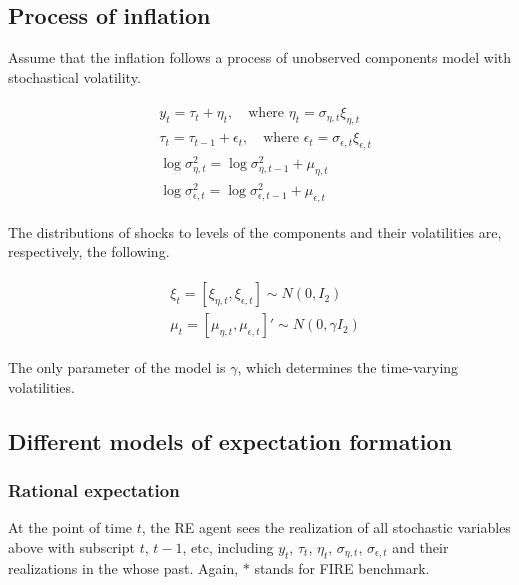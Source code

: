 \documentclass[]{article}
\begin{document}
\subsection{Process of inflation}

Assume that the inflation follows a process of unobserved components model with stochastical volatility. 

\begin{eqnarray}
\begin{split}
& y_t = \tau_t + \eta_t,\quad \textrm{where } \eta_t =\sigma_{\eta,t} \xi_{\eta,t} \\
& \tau_t = \tau_{t-1} + \epsilon_t, \quad \textrm{where }  \epsilon_t =\sigma_{\epsilon,t} \xi_{\epsilon,t} \\
& \log\sigma^2_{\eta,t} = \log\sigma^2_{\eta,t-1} + \mu_{\eta,t} \\
& \log\sigma^2_{\epsilon,t} = \log\sigma^2_{\epsilon,t-1} + \mu_{\epsilon,t} 
\end{split}
\end{eqnarray}

The distributions of shocks to levels of the components and their volatilities are, respectively, the following.

\begin{eqnarray}
\begin{split}
& \xi_t =[\xi_{\eta,t},\xi_{\epsilon,t}] \sim N(0,I_2) \\
& \mu_{t} = [\mu_{\eta,t},\mu_{\epsilon,t}]' \sim N(0,\gamma I_2) 
\end{split}
\end{eqnarray}

The only parameter of the model is $\gamma$, which determines the time-varying volatilities. 

\subsection{Different models of expectation formation}

\subsubsection{Rational expectation}

At the point of time $t$, the RE agent sees the realization of all stochastic variables above with subscript $t$, $t-1$, etc, including $y_t$, $\tau_t$, $\eta_t$, $\sigma_{\eta,t}$, $\sigma_{\epsilon,t}$ and their realizations in the whose past. Again, $*$ stands for FIRE benchmark. 
\end{document}
